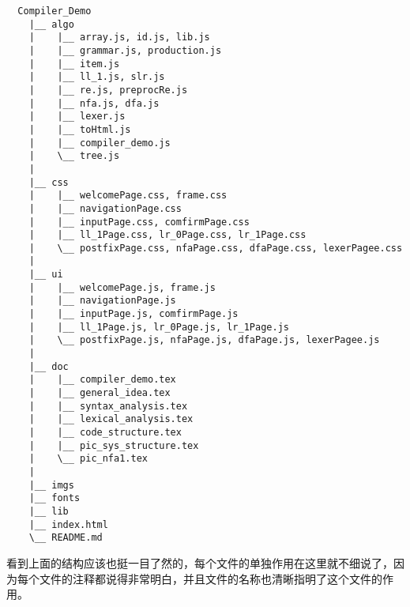 \scriptsize
\begin{verbatim}
  Compiler_Demo
    |__ algo
    |    |__ array.js, id.js, lib.js
    |    |__ grammar.js, production.js
    |    |__ item.js
    |    |__ ll_1.js, slr.js
    |    |__ re.js, preprocRe.js
    |    |__ nfa.js, dfa.js
    |    |__ lexer.js
    |    |__ toHtml.js
    |    |__ compiler_demo.js
    |    \__ tree.js
    |
    |__ css
    |    |__ welcomePage.css, frame.css
    |    |__ navigationPage.css
    |    |__ inputPage.css, comfirmPage.css
    |    |__ ll_1Page.css, lr_0Page.css, lr_1Page.css
    |    \__ postfixPage.css, nfaPage.css, dfaPage.css, lexerPagee.css
    |
    |__ ui
    |    |__ welcomePage.js, frame.js
    |    |__ navigationPage.js
    |    |__ inputPage.js, comfirmPage.js
    |    |__ ll_1Page.js, lr_0Page.js, lr_1Page.js
    |    \__ postfixPage.js, nfaPage.js, dfaPage.js, lexerPagee.js
    |
    |__ doc
    |    |__ compiler_demo.tex
    |    |__ general_idea.tex
    |    |__ syntax_analysis.tex
    |    |__ lexical_analysis.tex
    |    |__ code_structure.tex
    |    |__ pic_sys_structure.tex
    |    \__ pic_nfa1.tex
    |
    |__ imgs
    |__ fonts
    |__ lib
    |__ index.html
    \__ README.md
\end{verbatim}

\normalsize
看到上面的结构应该也挺一目了然的，每个文件的单独作用在这里就不细说了，因为每个文件的注释都说得非常明白，并且文件的名称也清晰指明了这个文件的作用。
